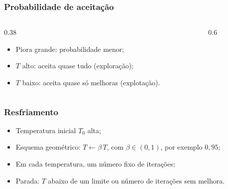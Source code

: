\documentclass[fleqn]{beamer}
\begin{document}
\begin{frame}
	\frametitle{Probabilidade de aceitação}
	\begin{columns}[T]
	\begin{column}{0.38\textwidth}
	\begin{itemize}
		\item Piora grande: probabilidade menor;
		\item $T$ alto: aceita quase tudo (exploração);
		\item $T$ baixo: aceita quase só melhoras (explotação).
	\end{itemize}
	\end{column}
	\begin{column}{0.6\textwidth}
	\end{column}
	\end{columns}
\end{frame}

\begin{frame}
	\frametitle{Resfriamento}
	\begin{itemize}
		\item Temperatura inicial $T_0$ alta;
		\item Esquema geométrico: $T \leftarrow \beta\,T$, com
			$\beta \in (0,1)$, por exemplo $0{,}95$;
		\item Em cada temperatura, um número fixo de iterações;
		\item Parada: $T$ abaixo de um limite ou número de iterações sem
			melhora.
	\end{itemize}
\end{frame}
\end{document}
